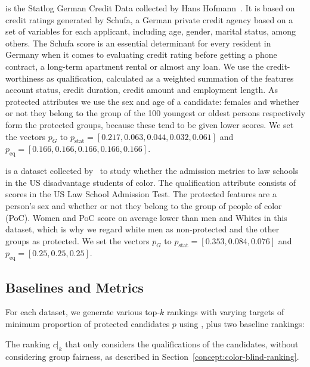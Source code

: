  is the Statlog German Credit Data collected by Hans Hofmann~\cite{lichman_2013_uci}.
%
It is based on credit ratings generated by Schufa, a German private credit agency based on a set of variables for each applicant, including age, gender, marital status, among others. The Schufa score is an essential determinant for every resident in Germany when it comes to evaluating credit rating before getting a phone contract, a long-term apartment rental or almost any loan.
%
We use the credit-worthiness as qualification, calculated as a weighted summation of the features account status, credit duration, credit amount and employment length. 
%
As protected attributes we use the sex and age of a candidate: females and whether or not they belong to the group of the 100 youngest or oldest persons respectively form the protected groups, because these tend to be given lower scores.
%
We set the vectors $p_G$ to $p_{\text{stat}}=[0.217,0.063,0.044,0.032,0.061]$ and $p_{\text{eq}}=[0.166,0.166,0.166,0.166,0.166]$. 

 is a dataset collected by~\citet{wightman1998lsac} to study whether the admission metrics to law schools in the US disadvantage students of color. 
%
The qualification attribute consists of scores in the US Law School Admission Test.
%
The protected features are a person's sex and whether or not they belong to the group of people of color (PoC).
%
Women and PoC score on average lower than men and Whites in this dataset, which is why we regard white men as non-protected and the other groups as protected.
%
We set the vectors $p_G$ to $p_{\text{stat}}=[0.353,0.084,0.076]$ and $p_{\text{eq}}=[0.25,0.25,0.25]$. 

\subsection{Baselines and Metrics}\label{sec:experiments-baselines}

For each dataset, we generate various top-$k$ rankings with varying targets of minimum proportion of protected candidates $p$ using \algoFAIR, plus two baseline rankings:

 The ranking $c|_k$ that only considers the qualifications of the candidates, without considering group fairness, as described in Section~\ref{concept:color-blind-ranking}.

